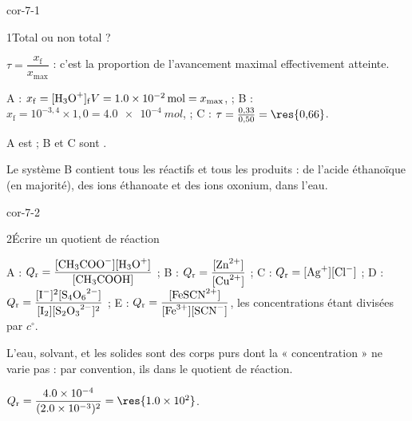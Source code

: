 \corrigesSouples

\begin{blocLivre}{cor-7-1}
\begin{corrige}{1}{Total ou non total ?}
\begin{questions}
\item $\tau=\dfrac{x_\mathrm{f}}{x_{\max}}$ : c'est la proportion de l'avancement maximal effectivement atteinte.
\item A : $x_\mathrm{f}=[\ce{H3O+}]_\mathrm{f}V=\qty{1,0e-2}{mol}=x_{\max}$,  ; B : $x_\mathrm{f}=10^{-3{,}4}\times1{,}0=\qty{4,0e-4}{mol}$,
 ; C : $\tau=\frac{0{,}33}{0{,}50}=\res{0{,}66}$.
\item A est  ; B et C sont .
\item Le système B contient tous les réactifs et tous les produits : de l'acide éthanoïque (en majorité), des ions
éthanoate et des ions oxonium, dans l'eau.
\end{questions}
\end{corrige}
\end{blocLivre}
\begin{blocLivre}{cor-7-2}
\begin{corrige}{2}{Écrire un quotient de réaction}
\begin{questions}
\item A : $Q_\mathrm{r}=\dfrac{[\ce{CH3COO-}][\ce{H3O+}]}{[\ce{CH3COOH}]}$ ; B : $Q_\mathrm{r}=\dfrac{[\ce{Zn^2+}]}{[\ce{Cu^2+}]}$ ;
C : $Q_\mathrm{r}=[\ce{Ag+}][\ce{Cl-}]$ ; D : $Q_\mathrm{r}=\dfrac{[\ce{I-}]^2[\ce{S4O6^2-}]}{[\ce{I2}][\ce{S2O3^2-}]^2}$ ;
E : $Q_\mathrm{r}=\dfrac{[\ce{FeSCN^2+}]}{[\ce{Fe^3+}][\ce{SCN-}]}$, les concentrations étant divisées par $c^\circ$.
\item L'eau, solvant, et les solides sont des corps purs dont la « concentration » ne varie pas : par convention, ils
 dans le quotient de réaction.
\item $Q_\mathrm{r}=\dfrac{\num{4.0e-4}}{(\num{2.0e-3})^2}=\res{\num{1.0e2}}$.
\end{questions}
\end{corrige}
\end{blocLivre}

